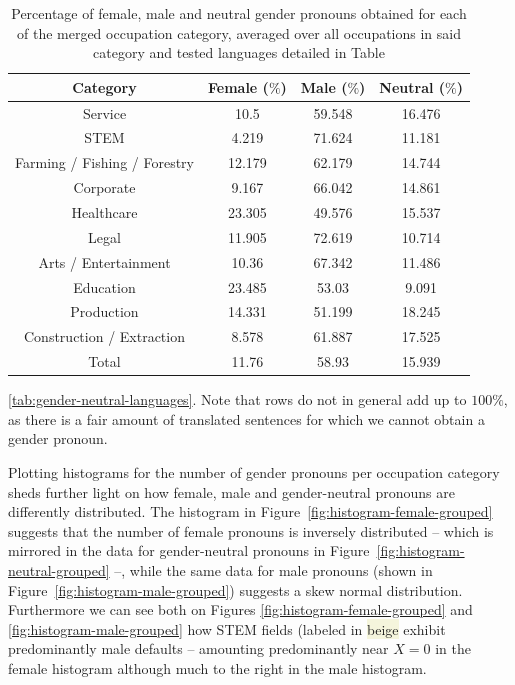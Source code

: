 \documentclass[twoside,11pt]{article}
\begin{document}
\begin{table}[H]
\centering
\small{
	\begin{tabular}{|c|c|c|c|}
	\hline
	Category 								& Female ($\%$)			& Male ($\%$)			& Neutral ($\%$)	\\ \hline
	\hline
	Service & 10.5 & 59.548 & 16.476 \\ \hline
	STEM & 4.219 & 71.624 & 11.181 \\ \hline
	Farming / Fishing / Forestry & 12.179 & 62.179 & 14.744 \\ \hline
	Corporate & 9.167 & 66.042 & 14.861 \\ \hline
	Healthcare & 23.305 & 49.576 & 15.537 \\ \hline
	Legal & 11.905 & 72.619 & 10.714 \\ \hline
	Arts / Entertainment & 10.36 & 67.342 & 11.486 \\ \hline
	Education & 23.485 & 53.03 & 9.091 \\ \hline
	Production & 14.331 & 51.199 & 18.245 \\ \hline
	Construction / Extraction & 8.578 & 61.887 & 17.525 \\ \hline \hline
	Total & 11.76 & 58.93 & 15.939 \\ \hline

	\end{tabular}
	}
    \caption{Percentage of female, male and neutral gender pronouns obtained for each of the merged occupation category, averaged over all occupations in said category and tested languages detailed in Table} \ref{tab:gender-neutral-languages}. Note that rows do not in general add up to $100\%$, as there is a fair amount of translated sentences for which we cannot obtain a gender pronoun.
	\label{tab:gender-by-category-grouped}
\end{table}


Plotting histograms for the number of gender pronouns per occupation category sheds further light on how female, male and gender-neutral pronouns are differently distributed. The histogram in Figure~\ref{fig:histogram-female-grouped} suggests that the number of female pronouns is inversely distributed -- which is mirrored in the data for gender-neutral pronouns in Figure~\ref{fig:histogram-neutral-grouped} --, while the same data for male pronouns (shown in Figure~\ref{fig:histogram-male-grouped}) suggests a skew normal distribution. Furthermore we can see both on Figures \ref{fig:histogram-female-grouped} and \ref{fig:histogram-male-grouped} how STEM fields (labeled in \colorbox{beige}{beige}%
exhibit predominantly male defaults -- amounting predominantly near $X = 0$ in the female histogram although much to the right in the male histogram.
\end{document}
